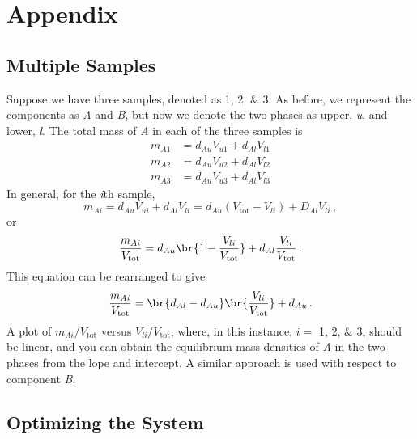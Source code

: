 \nocite{*}
\printbibliography[category=cited]%

\printbibliography[%
  title={Further Reading},%
  resetnumbers,%
  omitnumbers,%
	notcategory=cited,%
	]


\section{Appendix}
\label{sec:appendix}

\subsection{Multiple Samples}
\label{subs:multiple_samples}

Suppose we have three samples, denoted as \numlist{1;2;3}. 
As before, we represent the components as \emph{A} and \emph{B}, but now we denote the two phases as upper, \emph{u}, and lower, \emph{l}. 
The total mass of \emph{A} in each of the three samples is 
\begin{align*}
  m_{A1} & = d_{Au} V_{u1} + d_{Al} V_{l1} \\
  m_{A2} & = d_{Au} V_{u2} + d_{Al} V_{l2} \\
  m_{A3} & = d_{Au} V_{u3} + d_{Al} V_{l3}
  \label{eq:three_samples}
\end{align*}
In general, for the \emph{i}th sample, 
\begin{equation}
  m_{Ai} = d_{Au} V_{ui} + d_{Al} V_{li} = d_{Au} (V_\text{tot} - V_{li}) + D_{Al} V_{li} \, ,
  \label{eq:ith_sample}
\end{equation}
or
\begin{equation}
  \frac{m_{Ai}}{V_\text{tot}} = d_{Au} \br{1 - \frac{V_{li}}{V_\text{tot}}} + d_{Al} \frac{V_{li}}{V_\text{tot}} \, .
\end{equation}
This equation can be rearranged to give 
\begin{equation}
  \frac{m_{Ai}}{V_\text{tot}} = \br{d_{Al} - d_{Au}} \br{\frac{V_{li}}{V_\text{tot}}} + d_{Au} \, .
  \label{eq:scaled_ith_sample}
\end{equation}
A plot of \(m_{Ai}/V_\text{tot}\) versus \(V_{li}/V_\text{tot}\), where, in this instance, \(i =\) \numlist{1;2;3}, should be linear, and you can obtain the equilibrium mass densities of \emph{A} in the two phases from the lope and intercept. 
A similar approach is used with respect to component \emph{B}. 

\subsection{Optimizing the System}
\label{subs:optimizin_the_system}

